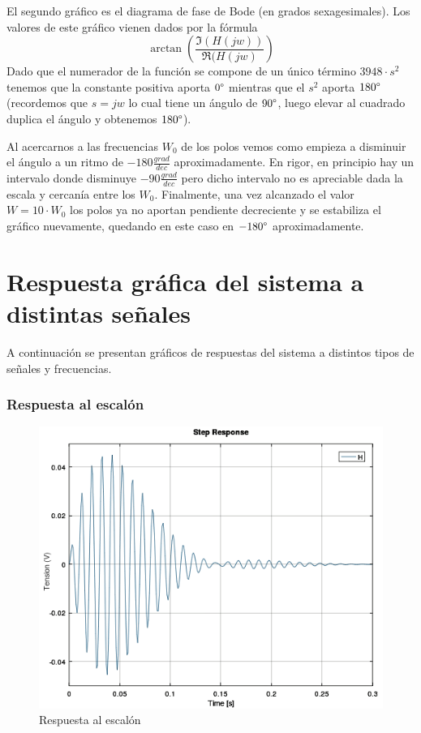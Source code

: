 \documentclass[11pt,a4paper]{report}
\begin{document}
\bigskip
El segundo gráfico es el diagrama de fase de Bode (en grados sexagesimales). 
Los valores de este gráfico vienen dados por la fórmula 
\[\arctan(\frac{\Im(H(jw))}{\Re(H(jw)})\]
Dado que el numerador de la función se compone de un único término $3948 \cdot s^2$ 
tenemos que la constante positiva aporta $0\degree$ mientras que el $s^2$ aporta
$180\degree$ (recordemos que $s=jw$ lo cual tiene un ángulo de $90\degree$, luego elevar al cuadrado duplica el ángulo y obtenemos $180\degree$).

\bigskip
Al acercarnos a las frecuencias $W_{0}$ de los polos vemos como empieza a disminuir el ángulo a un ritmo de $-180 \frac{grad}{dec}$ aproximadamente. En rigor, en principio hay un intervalo donde disminuye $-90 \frac{grad}{dec}$ pero dicho intervalo no es apreciable dada la escala y cercanía entre los $W_{0}$. 
Finalmente, una vez alcanzado el valor $W=10 \cdot W_{0}$ los polos ya no aportan
pendiente decreciente y se estabiliza el gráfico nuevamente, quedando en este caso
en $-180\degree$ aproximadamente.

\newpage
\section*{Respuesta gráfica del sistema a distintas señales}

A continuación se presentan gráficos de respuestas del sistema a distintos tipos
de señales y frecuencias.

\subsubsection*{Respuesta al escalón}

\begin{figure}[h!]
\includegraphics[scale=0.7]{RtaEscalon.png}
\caption{Respuesta al escalón}
\end{figure}
\end{document}
